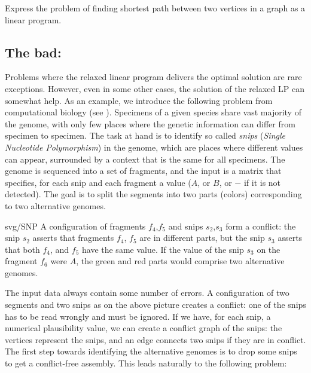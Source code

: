\begin{prob}
  Express the problem of finding shortest path between two vertices in a graph as a linear program.
\end{prob}

\subsection*{The bad: \minvcover}

Problems where the relaxed linear program delivers the optimal solution are rare exceptions. However, even in
some other cases, the solution of the relaxed LP can somewhat help. As an example, we introduce the following
problem from computational biology (see \cite{lBILS01}). Specimens of a given species share vast
majority of the genome, with only few places where the genetic information can differ from specimen to specimen.
The task at hand is to identify so called {\em snips} 
({\em Single Nucleotide Polymorphism}) in the genome, which are places where different values can appear, surrounded
by a context that is the same for all specimens. The genome is sequenced into a set of fragments, and the input is
a matrix that specifies, for each snip and each fragment a value ($A$, or $B$, or $-$ if it is not detected). The
goal is to split the segments into two parts (colors) corresponding to two alternative genomes.

\begin{myfig}{0.4\textwidth}{svg/SNP}
A configuration of fragments  $f_4$,$f_5$ and snips  $s_2$,$s_3$ form a conflict:
the snip $s_2$ asserts that fragments $f_4$, $f_5$ are in different parts, but the snip $s_3$ asserts that
both $f_4$, and $f_5$ have the same value. If the value of the snip $s_3$ on the fragment $f_6$ were $A$,
the green and red parts would comprise two alternative genomes.
\end{myfig}

\noindent
The input data always contain some number of errors. A configuration of two segments and two snips as
on the above picture creates a conflict: one of the snips has to be read wrongly and must be ignored.
If we have, for each snip, a numerical plausibility value, we can create a conflict graph of the snips:
the vertices represent the snips, and an edge connects two snips if they are in conflict. The first step 
towards identifying the alternative genomes is to drop some snips to get a conflict-free assembly.
This leads naturally to the following problem:

